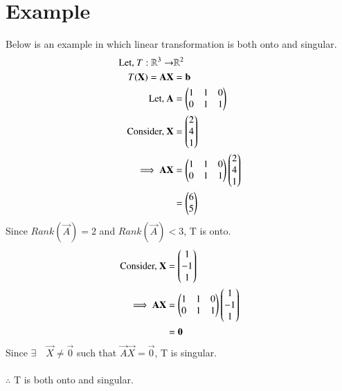 \documentclass[journal,12pt,twocolumn]{IEEEtran}
\begin{document}
\section{Example}
Below is an example in which linear transformation is both onto and singular.
\begin{align}
	\text{Let, }T:\mathbb{R}^3 \rightarrow &\mathbb{R}^2\\
	T(\mathbf{X}) = \mathbf{A}\mathbf{X} &= \mathbf{b}\\
	\text{Let, }\mathbf{A} &= \begin{pmatrix}1 & 1 & 0\\0 & 1 & 1\end{pmatrix}\\
	\text{Consider, }\mathbf{X} &= \begin{pmatrix}2\\4\\1\end{pmatrix}\\
	\implies \mathbf{A}\mathbf{X} &= \begin{pmatrix}1 & 1 & 0\\0 & 1 & 1\end{pmatrix}\begin{pmatrix}2\\4\\1\end{pmatrix}\\
	&= \begin{pmatrix}6\\5\end{pmatrix}
\end{align}
Since $Rank(\vec{A})=2$ and $Rank(\vec{A})<3$, T is onto.
\begin{align}
	\text{Consider, } \mathbf{X} &= \begin{pmatrix}1\\-1\\1\end{pmatrix}\\
	\implies \mathbf{A}\mathbf{X} &= \begin{pmatrix}1 & 1 & 0\\0 & 1 & 1\end{pmatrix}\begin{pmatrix}1\\-1\\1\end{pmatrix}\\
	&= \mathbf{0}
\end{align}
Since $\exists \quad \vec{X} \neq \vec{0}$ such that $\vec{A}\vec{X} = \vec{0}$, T is singular.\\
\\
$\therefore$ T is both onto and singular.
\end{document}
